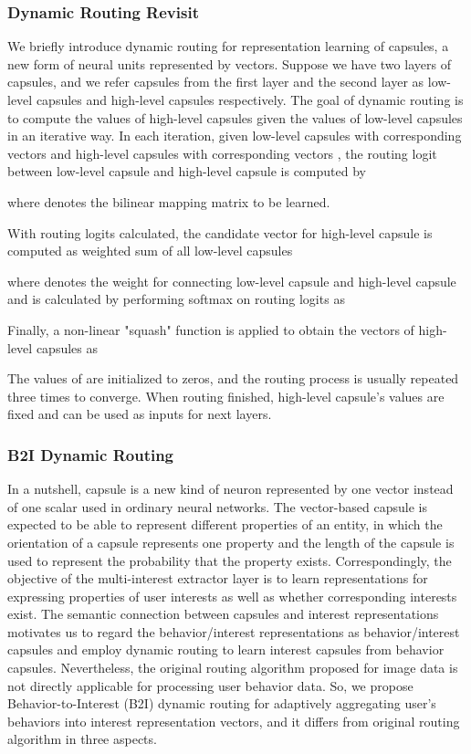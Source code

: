 \documentclass[sigconf]{acmart}
\begin{document}
\subsubsection{Dynamic Routing Revisit}
We briefly introduce dynamic routing \cite{sabour2017dynamic} for representation learning of capsules, a new form of neural units represented by vectors.
Suppose we have two layers of capsules, and we refer capsules from the first layer and the second layer as low-level capsules and high-level capsules respectively.
The goal of dynamic routing is to compute the values of high-level capsules given the values of low-level capsules in an iterative way.
In each iteration, given low-level capsules  with corresponding vectors  and high-level capsules  with corresponding vectors , the routing logit  between low-level capsule  and high-level capsule  is computed by

where  denotes the bilinear mapping matrix to be learned.

With routing logits calculated, the candidate vector for high-level capsule  is computed as weighted sum of all low-level capsules

where  denotes the weight for connecting low-level capsule  and high-level capsule  and is calculated by performing softmax on routing logits as


Finally, a non-linear "squash" function is applied to obtain the vectors of high-level capsules as



The values of  are initialized to zeros, and the routing process is usually repeated three times to converge.
When routing finished, high-level capsule's values  are fixed and can be used as inputs for next layers.\

\subsubsection{B2I Dynamic Routing}
\label{sec:b2i}
In a nutshell, capsule is a new kind of neuron represented by one vector instead of one scalar used in ordinary neural networks.
The vector-based capsule is expected to be able to represent different properties of an entity, in which the orientation of a capsule represents one property and the length of the capsule is used to represent the probability that the property exists.
Correspondingly, the objective of the multi-interest extractor layer is to learn representations for expressing properties of user interests as well as whether corresponding interests exist.
The semantic connection between capsules and interest representations motivates us to regard the behavior/interest representations as behavior/interest capsules and employ dynamic routing to learn interest capsules from behavior capsules.
Nevertheless, the original routing algorithm proposed for image data is not directly applicable for processing user behavior data.
So, we propose Behavior-to-Interest (B2I) dynamic routing for adaptively aggregating user's behaviors into interest representation vectors, and it differs from original routing algorithm in three aspects.
\end{document}
